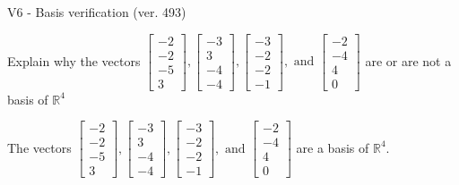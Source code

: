 \begin{exercise}
  \begin{exerciseTitle}V6 - Basis verification (ver. 493)\end{exerciseTitle}
  \begin{exerciseStatement}
    Explain why the vectors \(\left[\begin{array}{r}
-2 \\
-2 \\
-5 \\
3
\end{array}\right] , \left[\begin{array}{r}
-3 \\
3 \\
-4 \\
-4
\end{array}\right] , \left[\begin{array}{r}
-3 \\
-2 \\
-2 \\
-1
\end{array}\right] , \text{ and } \left[\begin{array}{r}
-2 \\
-4 \\
4 \\
0
\end{array}\right]\) are or are not a basis of \(\mathbb{R}^4\)	


  \end{exerciseStatement}
  \begin{exerciseAnswer}
   The vectors \(\left[\begin{array}{r}
-2 \\
-2 \\
-5 \\
3
\end{array}\right] , \left[\begin{array}{r}
-3 \\
3 \\
-4 \\
-4
\end{array}\right] , \left[\begin{array}{r}
-3 \\
-2 \\
-2 \\
-1
\end{array}\right] , \text{ and } \left[\begin{array}{r}
-2 \\
-4 \\
4 \\
0
\end{array}\right]\) 
  	 are  a basis of \(\mathbb{R}^4\).
  


  \end{exerciseAnswer}
\end{exercise}
